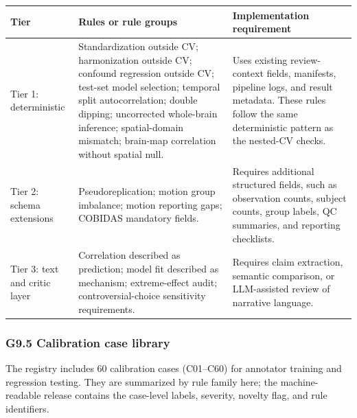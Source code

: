 \begin{longtable}{|>{\RaggedRight\hspace{0pt}\arraybackslash}p{}|>{\RaggedRight\hspace{0pt}\arraybackslash}p{}|>{\RaggedRight\hspace{0pt}\arraybackslash}p{}|}
\hline
\rowcolor{brtablehead}\textbf{Tier} & \textbf{Rules or rule groups} & \textbf{Implementation requirement} \\
\hline
Tier 1: deterministic & Standardization outside CV; harmonization outside CV; confound regression outside CV; test-set model selection; temporal split autocorrelation; double dipping; uncorrected whole-brain inference; spatial-domain mismatch; brain-map correlation without spatial null. & Uses existing review-context fields, manifests, pipeline logs, and result metadata. These rules follow the same deterministic pattern as the nested-CV checks. \\
\hline
Tier 2: schema extensions & Pseudoreplication; motion group imbalance; motion reporting gaps; COBIDAS mandatory fields. & Requires additional structured fields, such as observation counts, subject counts, group labels, QC summaries, and reporting checklists. \\
\hline
Tier 3: text and critic layer & Correlation described as prediction; model fit described as mechanism; extreme-effect audit; controversial-choice sensitivity requirements. & Requires claim extraction, semantic comparison, or LLM-assisted review of narrative language. \\
\hline
\end{longtable}

\subsubsection{\texorpdfstring{\textbf{G9.5 Calibration case library}}{G9.5 Calibration case library}}

The registry includes 60 calibration cases (C01--C60) for annotator training and regression testing. They are summarized by rule family here; the machine-readable release contains the case-level labels, severity, novelty flag, and rule identifiers.

